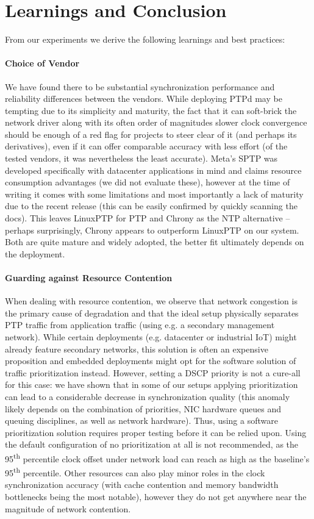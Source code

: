 
\section{Learnings and Conclusion}
From our experiments we derive the following learnings and best practices:

\paragraph{Choice of Vendor} We have found there to be substantial synchronization performance and reliability differences between the vendors. While deploying PTPd may be tempting due to its simplicity and maturity, the fact that it can soft-brick the network driver along with its often order of magnitudes slower clock convergence should be enough of a red flag for projects to steer clear of it (and perhaps its derivatives), even if it can offer comparable accuracy with less effort (of the tested vendors, it was nevertheless the least accurate). Meta's SPTP was developed specifically with datacenter applications in mind and claims resource consumption advantages (we did not evaluate these), however at the time of writing it comes with some limitations and most importantly a lack of maturity due to the recent release (this can be easily confirmed by quickly scanning the docs). This leaves LinuxPTP for PTP and Chrony as the NTP alternative -- perhaps surprisingly, Chrony appears to outperform LinuxPTP on our system. Both are quite mature and widely adopted, the better fit ultimately depends on the deployment.

\paragraph{Guarding against Resource Contention}
When dealing with resource contention, we observe that network congestion is the primary cause of degradation and that the ideal setup physically separates PTP traffic from application traffic (using e.g. a secondary management network). While certain deployments (e.g. datacenter or industrial IoT) might already feature secondary networks, this solution is often an expensive proposition and embedded deployments might opt for the software solution of traffic prioritization instead. However, setting a DSCP priority is not a cure-all for this case: we have shown that in some of our setups applying prioritization can lead to a considerable decrease in synchronization quality (this anomaly likely depends on the combination of priorities, NIC hardware queues and queuing disciplines, as well as network hardware). Thus, using a software prioritization solution requires proper testing before it can be relied upon. Using the default configuration of no prioritization at all is not recommended, as the 95\textsuperscript{th} percentile clock offset under network load can reach as high as \fRatio[-2]{\cmpMax} the baseline's 95\textsuperscript{th} percentile. Other resources can also play minor roles in the clock synchronization accuracy (with cache contention and memory bandwidth bottlenecks being the most notable), however they do not get anywhere near the magnitude of network contention.


